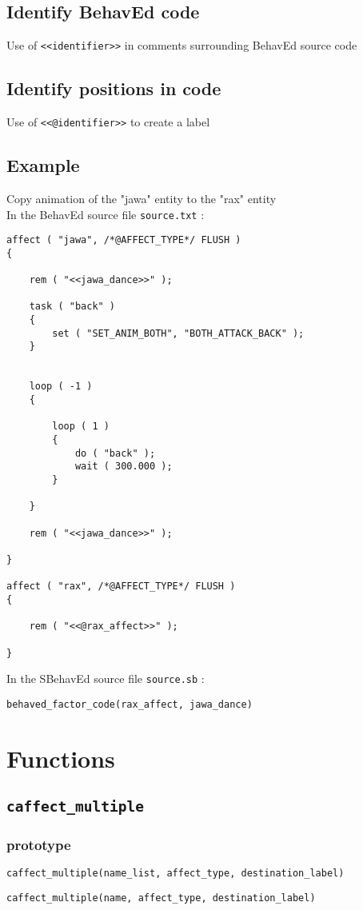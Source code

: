 \documentclass{article}
\begin{document}
\subsection{Identify BehavEd code}
Use of \texttt{<<identifier>>} in comments surrounding BehavEd source code
\subsection{Identify positions in code}
Use of \texttt{<<@identifier>>} to create a label
\subsection{Example}
Copy animation of the "jawa" entity to the "rax" entity\\
In the BehavEd source file \texttt{source.txt} :
\begin{lstlisting}
affect ( "jawa", /*@AFFECT_TYPE*/ FLUSH )
{

	rem ( "<<jawa_dance>>" );

	task ( "back" )
	{
		set ( "SET_ANIM_BOTH", "BOTH_ATTACK_BACK" );
	}


	loop ( -1 )
	{

		loop ( 1 )
		{
			do ( "back" );
			wait ( 300.000 );
		}

	}

	rem ( "<<jawa_dance>>" );

}

affect ( "rax", /*@AFFECT_TYPE*/ FLUSH )
{

	rem ( "<<@rax_affect>>" );

}
\end{lstlisting}
In the SBehavEd source file \texttt{source.sb} :
\begin{lstlisting}
behaved_factor_code(rax_affect, jawa_dance)
\end{lstlisting}


\newpage
\section{Functions}

\subsection{\texttt{caffect_multiple}}
\subsubsection*{prototype}
\begin{lstlisting}
caffect_multiple(name_list, affect_type, destination_label)
\end{lstlisting}
\begin{lstlisting}
caffect_multiple(name, affect_type, destination_label)
\end{lstlisting}
\end{document}
